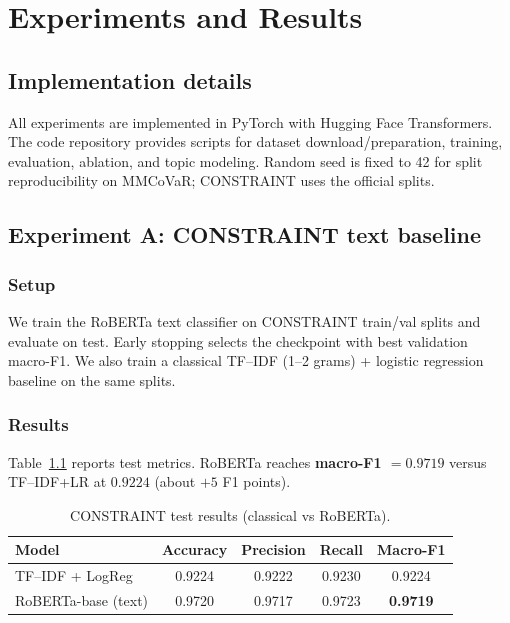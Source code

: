\chapter{Experiments and Results}
\label{ch:exp}

\section{Implementation details}

All experiments are implemented in PyTorch with Hugging Face Transformers.
The code repository provides scripts for dataset download/preparation, training, evaluation, ablation, and topic modeling.
Random seed is fixed to 42 for split reproducibility on MMCoVaR; CONSTRAINT uses the official splits.

\section{Experiment A: CONSTRAINT text baseline}
\label{sec:exp-constraint}

\subsection{Setup}
We train the RoBERTa text classifier on CONSTRAINT train/val splits and evaluate on test.
Early stopping selects the checkpoint with best validation macro-F1.
We also train a classical TF--IDF (1--2 grams) + logistic regression baseline on the same splits.

\subsection{Results}
Table~\ref{tab:constraint-results} reports test metrics.
RoBERTa reaches \textbf{macro-F1 $= 0.9719$} versus TF--IDF+LR at $0.9224$ (about $+5$ F1 points).

\begin{table}[H]
\centering
\caption{CONSTRAINT test results (classical vs RoBERTa).}
\label{tab:constraint-results}
\begin{tabular}{lcccc}
\toprule
Model & Accuracy & Precision & Recall & Macro-F1 \\
\midrule
TF--IDF + LogReg & 0.9224 & 0.9222 & 0.9230 & 0.9224 \\
RoBERTa-base (text) & 0.9720 & 0.9717 & 0.9723 & \textbf{0.9719} \\
\bottomrule
\end{tabular}
\end{table}

